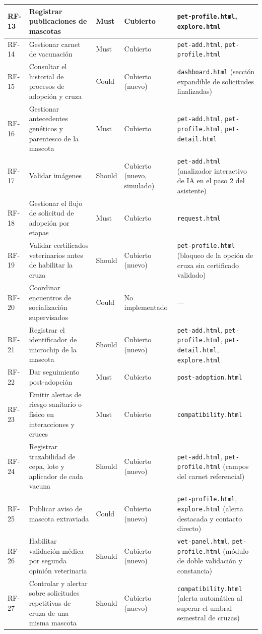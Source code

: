 \documentclass[journal,onecolumn]{IEEEtran}
\begin{document}
\begin{longtable}{@{}p{1.5cm} p{5.2cm} p{1.7cm} p{3.0cm} p{3.4cm}@{}}
		\hline
		RF-13 & Registrar publicaciones de mascotas & Must & Cubierto & \texttt{pet-profile.html}, \texttt{explore.html} \\
		\hline
		RF-14 & Gestionar carnet de vacunación & Must & Cubierto & \texttt{pet-add.html}, \texttt{pet-profile.html} \\
		\hline
		RF-15 & Consultar el historial de procesos de adopción y cruza & Could & Cubierto (nuevo) & \texttt{dashboard.html} (sección expandible de solicitudes finalizadas) \\
		\hline
		RF-16 & Gestionar antecedentes genéticos y parentesco de la mascota & Must & Cubierto & \texttt{pet-add.html}, \texttt{pet-profile.html}, \texttt{pet-detail.html} \\
		\hline
		RF-17 & Validar imágenes & Should & Cubierto (nuevo, simulado) & \texttt{pet-add.html} (analizador interactivo de IA en el paso 2 del asistente) \\
		\hline
		RF-18 & Gestionar el flujo de solicitud de adopción por etapas & Must & Cubierto & \texttt{request.html} \\
		\hline
		RF-19 & Validar certificados veterinarios antes de habilitar la cruza & Should & Cubierto (nuevo) & \texttt{pet-profile.html} (bloqueo de la opción de cruza sin certificado validado) \\
		\hline
		RF-20 & Coordinar encuentros de socialización supervisados & Could & No implementado & --- \\
		\hline
		RF-21 & Registrar el identificador de microchip de la mascota & Should & Cubierto (nuevo) & \texttt{pet-add.html}, \texttt{pet-profile.html}, \texttt{pet-detail.html}, \texttt{explore.html} \\
		\hline
		RF-22 & Dar seguimiento post-adopción & Must & Cubierto & \texttt{post-adoption.html} \\
		\hline
		RF-23 & Emitir alertas de riesgo sanitario o físico en interacciones y cruces & Must & Cubierto & \texttt{compatibility.html} \\
		\hline
		RF-24 & Registrar trazabilidad de cepa, lote y aplicador de cada vacuna & Should & Cubierto (nuevo) & \texttt{pet-add.html}, \texttt{pet-profile.html} (campos del carnet referencial) \\
		\hline
		RF-25 & Publicar aviso de mascota extraviada & Could & Cubierto (nuevo) & \texttt{pet-profile.html}, \texttt{explore.html} (alerta destacada y contacto directo) \\
		\hline
		RF-26 & Habilitar validación médica por segunda opinión veterinaria & Should & Cubierto (nuevo) & \texttt{vet-panel.html}, \texttt{pet-profile.html} (módulo de doble validación y constancia) \\
		\hline
		RF-27 & Controlar y alertar sobre solicitudes repetitivas de cruza de una misma mascota & Should & Cubierto (nuevo) & \texttt{compatibility.html} (alerta automática al superar el umbral semestral de cruzas) \\
	\end{longtable}
	
\end{document}
